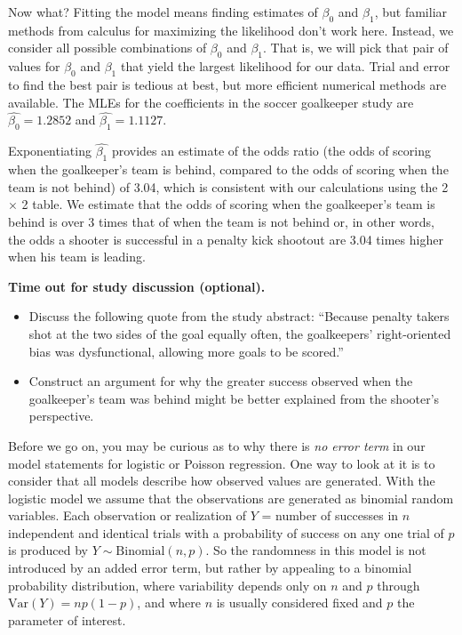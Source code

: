 \documentclass[
]{krantz}
\begin{document}
Now what? Fitting the model means finding estimates of \(\beta_0\) and \(\beta_1\), but familiar methods from calculus for maximizing the likelihood don't work here. Instead, we consider all possible combinations of \(\beta_0\) and \(\beta_1\). That is, we will pick that pair of values for \(\beta_0\) and \(\beta_1\) that yield the largest likelihood for our data. Trial and error to find the best pair is tedious at best, but more efficient numerical methods are available. The MLEs for the coefficients in the soccer goalkeeper study are \(\hat{\beta_0}= 1.2852\) and \(\hat{\beta_1}=1.1127\).

Exponentiating \(\hat{\beta_1}\) provides an estimate of the odds ratio (the odds of scoring when the goalkeeper's team is behind, compared to the odds of scoring when the team is not behind) of 3.04, which is consistent with our calculations using the 2 \(\times\) 2 table. We estimate that the odds of scoring when the goalkeeper's team is behind is over 3 times that of when the team is not behind or, in other words, the odds a shooter is successful in a penalty kick shootout are 3.04 times higher when his team is leading.
\vspace{5mm}

\textbf{Time out for study discussion (optional).}

\begin{itemize}
\item
  Discuss the following quote from the study abstract: ``Because penalty takers shot at the two sides of the goal equally often, the goalkeepers' right-oriented bias was dysfunctional, allowing more goals to be scored.''
\item
  Construct an argument for why the greater success observed when the goalkeeper's team was behind might be better explained from the shooter's perspective.
\end{itemize}

Before we go on, you may be curious as to why there is \emph{no error term} in our model statements for logistic or Poisson regression. One way to look at it is to consider that all models describe how observed values are generated. With the logistic model we assume that the observations are generated as binomial random variables. Each observation or realization of \(Y\) = number of successes in \(n\) independent and identical trials with a probability of success on any one trial of \(p\) is produced by \(Y \sim \textrm{Binomial}(n,p)\). So the randomness in this model is not introduced by an added error term, but rather by appealing to a binomial probability distribution, where variability depends only on \(n\) and \(p\) through \(\textrm{Var}(Y)=np(1-p)\), and where \(n\) is usually considered fixed and \(p\) the parameter of interest.
\end{document}
